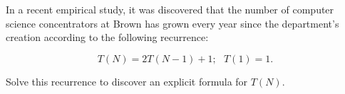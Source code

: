 In a recent empirical study, it was discovered that the number of
computer science concentrators at Brown has grown every year since the
department's creation according to the following recurrence:

\[  T(N)=2T(N-1)+1;~~~T(1)=1.\]

\noindent  Solve this recurrence to discover an explicit formula for
$T(N)$.

